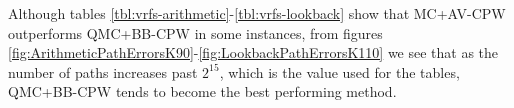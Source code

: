 Although tables \ref{tbl:vrfs-arithmetic}-\ref{tbl:vrfs-lookback} show that MC+AV-CPW outperforms QMC+BB-CPW in some instances, from figures \ref{fig:ArithmeticPathErrorsK90}-\ref{fig:LookbackPathErrorsK110} we see that as the number of paths increases past $2^{15}$, which is the value used for the tables, QMC+BB-CPW tends to become the best performing method.
